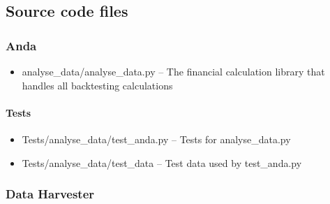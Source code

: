 \documentclass[main.tex]{subfiles}
\begin{document}
\subsection{Source code files}\label{source-code-files}

\subsubsection{Anda}\label{anda}

\begin{itemize}

\item
  analyse\_data/analyse\_data.py -- The financial calculation library
  that handles all backtesting calculations
\end{itemize}

\paragraph{Tests}\label{tests}

\begin{itemize}

\item
  Tests/analyse\_data/test\_anda.py -- Tests for analyse\_data.py
\item
  Tests/analyse\_data/test\_data -- Test data used by test\_anda.py
\end{itemize}

\subsubsection{Data Harvester}\label{data-harvester}
\end{document}
